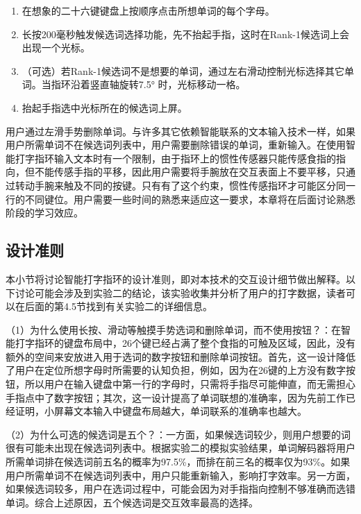\begin{enumerate}
\item 在想象的二十六键键盘上按顺序点击所想单词的每个字母。
\item 长按200毫秒触发候选词选择功能，先不抬起手指，这时在Rank-1候选词上会出现一个光标。
\item （可选）若Rank-1候选词不是想要的单词，通过左右滑动控制光标选择其它单词。当指环沿着竖直轴旋转7.5° 时，光标移动一格。
\item 抬起手指选中光标所在的候选词上屏。
\end{enumerate}

用户通过左滑手势删除单词。与许多其它依赖智能联系的文本输入技术一样\cite{markussen2014vulture, yi2017compass, yu2017tap}，如果用户所需单词不在候选词列表中，用户需要删除错误的单词，重新输入。在使用智能打字指环输入文本时有一个限制，由于指环上的惯性传感器只能传感食指的指向，但不能传感手指的平移，因此用户需要将手腕放在交互表面上不要平移，只通过转动手腕来触及不同的按键。只有有了这个约束，惯性传感指环才可能区分同一行的不同键位。用户需要一些时间的熟悉来适应这一要求，本章将在后面讨论熟悉阶段的学习效应。

\subsection{设计准则}

本小节将讨论智能打字指环的设计准则，即对本技术的交互设计细节做出解释。以下讨论可能会涉及到实验二的结论，该实验收集并分析了用户的打字数据，读者可以在后面的第4.5节找到有关实验二的详细信息。

{（1）为什么使用长按、滑动等触摸手势选词和删除单词，而不使用按钮？}：在智能打字指环的键盘布局中，26个键已经占满了整个食指的可触及区域，因此，没有额外的空间来安放进入用于选词的数字按钮和删除单词按钮。首先，这一设计降低了用户在定位所想字母时所需要的认知负担，例如，因为在26键的上方没有数字按钮，所以用户在输入键盘中第一行的字母时，只需将手指尽可能伸直，而无需担心手指点中了数字按钮；其次，这一设计提高了单词联想的准确率，因为先前工作已经证明，小屏幕文本输入中键盘布局越大，单词联系的准确率也越大\cite{yi2017too}。

{（2）为什么可选的候选词是五个？}：一方面，如果候选词较少，则用户想要的词很有可能未出现在候选词列表中。根据实验二的模拟实验结果，单词解码器将用户所需单词排在候选词前五名的概率为97.5\%，而排在前三名的概率仅为93\%。如果用户所需单词不在候选词列表中，用户只能重新输入，影响打字效率。另一方面，如果候选词较多，用户在选词过程中，可能会因为对手指指向控制不够准确而选错单词。综合上述原因，五个候选词是交互效率最高的选择。

